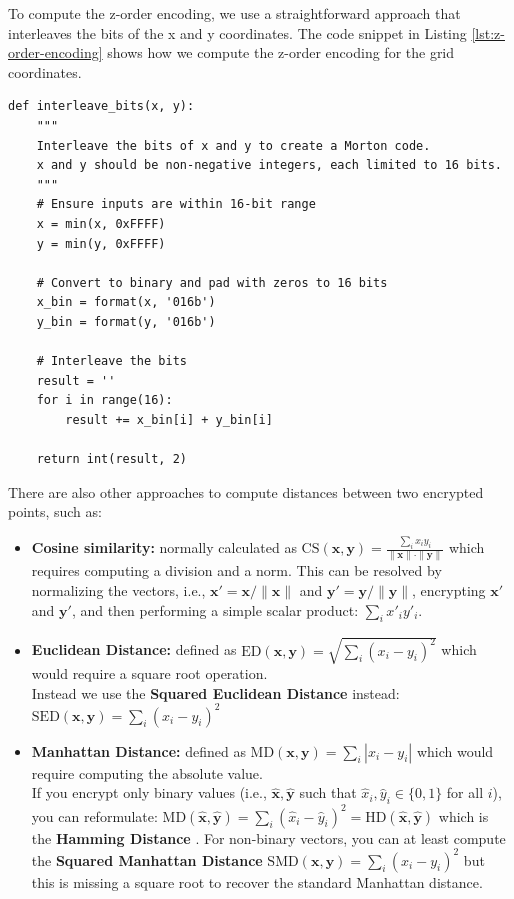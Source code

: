 To compute the z-order encoding, we use a straightforward approach that interleaves the bits of the x and y coordinates. The code snippet in Listing \ref{lst:z-order-encoding} shows how we compute the z-order encoding for the grid coordinates.

\begin{lstlisting}[caption={Z-order encoding for grid coordinates}, label={lst:z-order-encoding}]
def interleave_bits(x, y):
    """
    Interleave the bits of x and y to create a Morton code.
    x and y should be non-negative integers, each limited to 16 bits.
    """
    # Ensure inputs are within 16-bit range
    x = min(x, 0xFFFF)
    y = min(y, 0xFFFF)
    
    # Convert to binary and pad with zeros to 16 bits
    x_bin = format(x, '016b')
    y_bin = format(y, '016b')
    
    # Interleave the bits
    result = ''
    for i in range(16):
        result += x_bin[i] + y_bin[i]
    
    return int(result, 2)
\end{lstlisting}


There are also other approaches to compute distances between two encrypted points\cite{ibarrond2022hedistancetricks}, such as:
\begin{itemize}
    \item \textbf{Cosine similarity:} normally calculated as 
    $
    \mathrm{CS}(\mathbf{x}, \mathbf{y}) = \frac{\sum_i x_i y_i}{\|\mathbf{x}\| \cdot \|\mathbf{y}\|}
    $
    which requires computing a division and a norm. This can be resolved by normalizing the vectors, i.e., $\mathbf{x}' = \mathbf{x} / \|\mathbf{x}\|$ and $\mathbf{y}' = \mathbf{y} / \|\mathbf{y}\|$, encrypting $\mathbf{x}'$ and $\mathbf{y}'$, and then performing a simple scalar product: $\sum_i x'_i y'_i$.
    
    \item \textbf{Euclidean Distance:} defined as
    $
    \mathrm{ED}(\mathbf{x}, \mathbf{y}) = \sqrt{\sum_i (x_i - y_i)^2}
    $
    which would require a square root operation.\\
    Instead we use the \textbf{Squared Euclidean Distance} instead:
    $
    \mathrm{SED}(\mathbf{x}, \mathbf{y}) = \sum_i (x_i - y_i)^2
    $
    
    \item \textbf{Manhattan Distance:} defined as
    $
    \mathrm{MD}(\mathbf{x}, \mathbf{y}) = \sum_i |x_i - y_i|
    $
    which would require computing the absolute value.\\
    If you encrypt only binary values (i.e., $\hat{\mathbf{x}}, \hat{\mathbf{y}}$ such that $\hat{x}_i, \hat{y}_i \in \{0,1\}$ for all $i$), you can reformulate:
    $
    \mathrm{MD}(\hat{\mathbf{x}}, \hat{\mathbf{y}}) = \sum_i (\hat{x}_i - \hat{y}_i)^2 = \mathrm{HD}(\hat{\mathbf{x}}, \hat{\mathbf{y}})
    $
    which is the \textbf{Hamming Distance} . For non-binary vectors, you can at least compute the \textbf{Squared Manhattan Distance}
    $
    \mathrm{SMD}(\mathbf{x}, \mathbf{y}) = \sum_i (x_i - y_i)^2
    $
    but this is missing a square root to recover the standard Manhattan distance.
    
\end{itemize}

